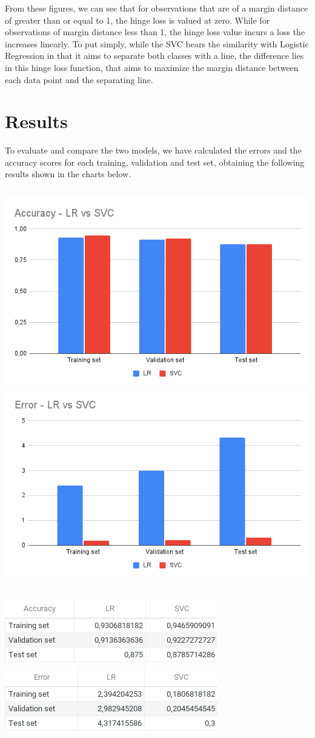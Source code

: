 \documentclass[a4paper,12pt]{article}
\begin{document}
From these figures, we can see that for observations that are of a margin distance of greater than or equal to 1, the hinge loss is valued at zero. While for observations of margin distance less than 1, the hinge loss value incurs a loss the increases linearly. To put simply, while the SVC bears the similarity with Logistic Regression in that it aims to separate both classes with a line, the difference lies in this hinge loss function, that aims to maximize the margin distance between each data point and the separating line.

\section{Results}
\label{sec:org96bdec5}

To evaluate and compare the two models, we have calculated the errors and the accuracy scores for each training, validation and test set, obtaining the following results shown in the charts below.
\begin{center}
\begin{tabular}{l}
\\
\end{tabular}
\end{center}
\includegraphics[height=0.3\textwidth]{./graphs/accuracy_chart.png}
\includegraphics[height=0.3\textwidth]{./graphs/error_chart.png}
\begin{center}
\begin{tabular}{l}
\\
\end{tabular}
\end{center}
\includegraphics[height=0.15\textwidth]{./graphs/accuracy_table.png}
\includegraphics[height=0.15\textwidth]{./graphs/error_table.png}
\end{document}
